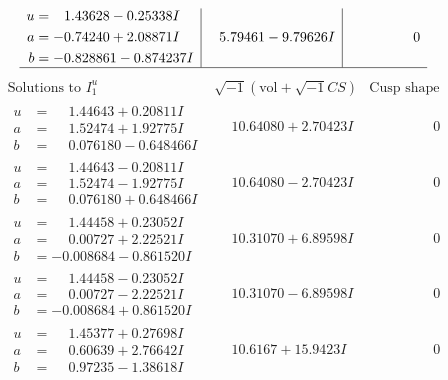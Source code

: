 \documentclass[1p]{elsarticle_modified}
\theoremstyle{definition}
\newcommand{\I}{\sqrt{-1}}
\begin{document}
$$\begin{array}{c|c|c}
\begin{aligned}
u &= \phantom{-}1.43628 - 0.25338 I \\
a &= -0.74240 + 2.08871 I \\
b &= -0.828861 - 0.874237 I\end{aligned}
 & \phantom{-}5.79461 - 9.79626 I & \phantom{-0.000000 } 0\\
 \hline 
 \end{array}$$\newpage$$\begin{array}{c|c|c}  
\text{Solutions to }I^u_{1}& \I (\text{vol} + \sqrt{-1}CS) & \text{Cusp shape}\\
 \hline 
\begin{aligned}
u &= \phantom{-}1.44643 + 0.20811 I \\
a &= \phantom{-}1.52474 + 1.92775 I \\
b &= \phantom{-}0.076180 - 0.648466 I\end{aligned}
 & \phantom{-}10.64080 + 2.70423 I & \phantom{-0.000000 } 0 \\ \hline\begin{aligned}
u &= \phantom{-}1.44643 - 0.20811 I \\
a &= \phantom{-}1.52474 - 1.92775 I \\
b &= \phantom{-}0.076180 + 0.648466 I\end{aligned}
 & \phantom{-}10.64080 - 2.70423 I & \phantom{-0.000000 } 0 \\ \hline\begin{aligned}
u &= \phantom{-}1.44458 + 0.23052 I \\
a &= \phantom{-}0.00727 + 2.22521 I \\
b &= -0.008684 - 0.861520 I\end{aligned}
 & \phantom{-}10.31070 + 6.89598 I & \phantom{-0.000000 } 0 \\ \hline\begin{aligned}
u &= \phantom{-}1.44458 - 0.23052 I \\
a &= \phantom{-}0.00727 - 2.22521 I \\
b &= -0.008684 + 0.861520 I\end{aligned}
 & \phantom{-}10.31070 - 6.89598 I & \phantom{-0.000000 } 0 \\ \hline\begin{aligned}
u &= \phantom{-}1.45377 + 0.27698 I \\
a &= \phantom{-}0.60639 + 2.76642 I \\
b &= \phantom{-}0.97235 - 1.38618 I\end{aligned}
 & \phantom{-}10.6167 + 15.9423 I & \phantom{-0.000000 } 0 \\ \hline\begin{aligned}

\end{aligned}
\end{array}$$
\end{document}
